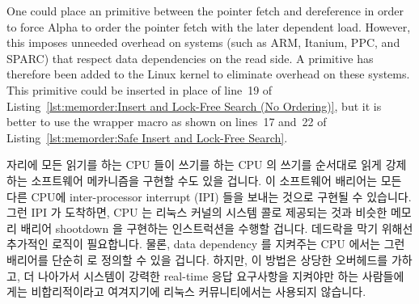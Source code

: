 One could place an  primitive
between the pointer fetch and dereference in order to force Alpha
to order the pointer fetch with the later dependent load.
However, this imposes unneeded overhead on systems (such as ARM,
Itanium, PPC, and SPARC) that respect data dependencies on the read side.
A  primitive has therefore been added to the
Linux kernel to eliminate overhead on these systems.
This primitive could be inserted in place of line~19 of
Listing~\ref{lst:memorder:Insert and Lock-Free Search (No Ordering)},
but it is better to use the  wrapper macro
as shown on lines~17 and~22 of
Listing~\ref{lst:memorder:Safe Insert and Lock-Free Search}.
\fi

 자리에 모든 읽기를 하는 CPU 들이 쓰기를 하는 CPU 의 쓰기를
순서대로 읽게 강제하는 소프트웨어 메카니즘을 구현할 수도 있을 겁니다.
이 소프트웨어 배리어는 모든 다른 CPU에 inter-processor interrupt (IPI) 들을
보내는 것으로 구현될 수 있습니다.
그런 IPI 가 도착하면, CPU 는 리눅스 커널의  시스템 콜로
제공되는 것과 비슷한 메모리 배리어 shootdown 을 구현하는 인스트럭션을 수행할
겁니다.
데드락을 막기 위해선 추가적인 로직이 필요합니다.
물론, data dependency 를 지켜주는 CPU 에서는 그런 배리어를 단순히
 로 정의할 수 있을 겁니다.
하지만, 이 방법은 상당한 오버헤드를 가하고, 더 나아가서 시스템이 강력한
real-time 응답 요구사항을 지켜야만 하는 사람들에게는 비합리적이라고 여겨지기에
리눅스 커뮤니티에서는 사용되지 않습니다.

